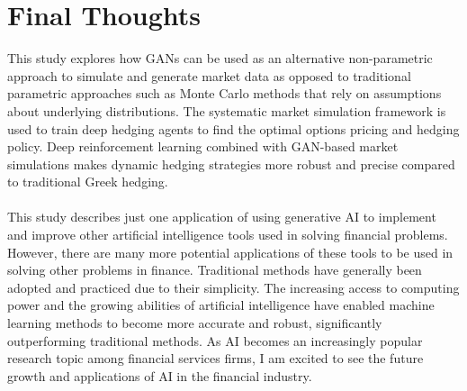 \section{Final Thoughts}
This study explores how GANs can be used as an alternative non-parametric approach to simulate and generate market data as opposed to traditional parametric approaches such as Monte Carlo methods that rely on assumptions about underlying distributions. The systematic market simulation framework is used to train deep hedging agents to find the optimal options pricing and hedging policy. Deep reinforcement learning combined with GAN-based market simulations makes dynamic hedging strategies more robust and precise compared to traditional Greek hedging. 
\\
\\
This study describes just one application of using generative AI to implement and improve other artificial intelligence tools used in solving financial problems. However, there are many more potential applications of these tools to be used in solving other problems in finance. Traditional methods have generally been adopted and practiced due to their simplicity. The increasing access to computing power and the growing abilities of artificial intelligence have enabled machine learning methods to become more accurate and robust, significantly outperforming traditional methods. As AI becomes an increasingly popular research topic among financial services firms, I am excited to see the future growth and applications of AI in the financial industry.